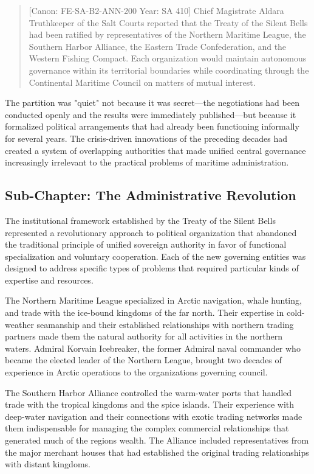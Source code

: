 \begin{quote}
{[}Canon: FE-SA-B2-ANN-200 \textbar{} Year: SA 410{]} Chief Magistrate
Aldara Truthkeeper of the Salt Courts reported that the Treaty of the
Silent Bells had been ratified by representatives of the Northern
Maritime League, the Southern Harbor Alliance, the Eastern Trade
Confederation, and the Western Fishing Compact. Each organization would
maintain autonomous governance within its territorial boundaries while
coordinating through the Continental Maritime Council on matters of
mutual interest.
\end{quote}

The partition was "quiet" not because it was secret---the negotiations
had been conducted openly and the results were immediately
published---but because it formalized political arrangements that had
already been functioning informally for several years. The crisis-driven
innovations of the preceding decades had created a system of overlapping
authorities that made unified central governance increasingly irrelevant
to the practical problems of maritime administration.

\subsection{Sub-Chapter: The Administrative
Revolution}\label{sub-chapter-the-administrative-revolution}

The institutional framework established by the Treaty of the Silent
Bells represented a revolutionary approach to political organization
that abandoned the traditional principle of unified sovereign authority
in favor of functional specialization and voluntary cooperation. Each of
the new governing entities was designed to address specific types of
problems that required particular kinds of expertise and resources.

The Northern Maritime League specialized in Arctic navigation, whale
hunting, and trade with the ice-bound kingdoms of the far north. Their
expertise in cold-weather seamanship and their established relationships
with northern trading partners made them the natural authority for all
activities in the northern waters. Admiral Korvain Icebreaker, the
former Admiral naval commander who became the elected leader of the
Northern League, brought two decades of experience in Arctic operations
to the organization\textquotesingle s governing council.

The Southern Harbor Alliance controlled the warm-water ports that
handled trade with the tropical kingdoms and the spice islands. Their
experience with deep-water navigation and their connections with exotic
trading networks made them indispensable for managing the complex
commercial relationships that generated much of the
region\textquotesingle s wealth. The Alliance included representatives
from the major merchant houses that had established the original trading
relationships with distant kingdoms.

